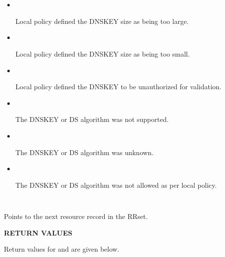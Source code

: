 \begin{description}
\begin{description}
\begin{itemize}
The key used to verify the RRSIG was not a valid DNSKEY.

\item {}\verb" "

Local policy defined the DNSKEY size as being too large.

\item {}\verb" "

Local policy defined the DNSKEY size as being too small.

\item {}\verb" "

Local policy defined the DNSKEY to be unauthorized for validation.

\item {}\verb" "

The DNSKEY or DS algorithm was not supported.

\item {}\verb" "

The DNSKEY or DS algorithm was unknown.

\item {}\verb" "

The DNSKEY or DS algorithm was not allowed as per local policy.

\end{itemize}

\item {}\verb" "

Points to the next resource record in the RRset.

\end{description}

\end{description}

{\bf RETURN VALUES}

Return values for  and
 are given below.

